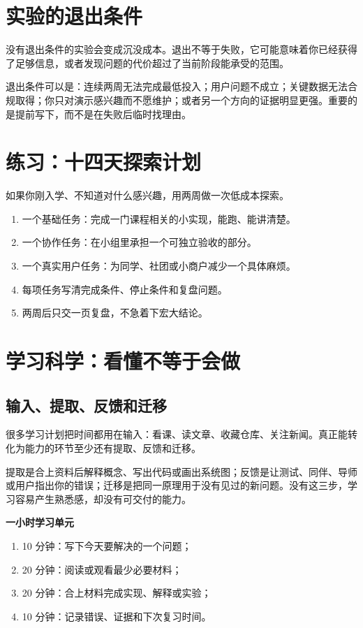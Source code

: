 \documentclass[UTF8,zihao=5,openany]{ctexbook}
\begin{document}
\section{实验的退出条件}
没有退出条件的实验会变成沉没成本。退出不等于失败，它可能意味着你已经获得了足够信息，或者发现问题的代价超过了当前阶段能承受的范围。

退出条件可以是：连续两周无法完成最低投入；用户问题不成立；关键数据无法合规取得；你只对演示感兴趣而不愿维护；或者另一个方向的证据明显更强。重要的是提前写下，而不是在失败后临时找理由。

\section{练习：十四天探索计划}
如果你刚入学、不知道对什么感兴趣，用两周做一次低成本探索。

\begin{enumerate}
\item 一个基础任务：完成一门课程相关的小实现，能跑、能讲清楚。
\item 一个协作任务：在小组里承担一个可独立验收的部分。
\item 一个真实用户任务：为同学、社团或小商户减少一个具体麻烦。
\item 每项任务写清完成条件、停止条件和复盘问题。
\item 两周后只交一页复盘，不急着下宏大结论。
\end{enumerate}

\section{学习科学：看懂不等于会做}
\subsection{输入、提取、反馈和迁移}
很多学习计划把时间都用在输入：看课、读文章、收藏仓库、关注新闻。真正能转化为能力的环节至少还有提取、反馈和迁移。

提取是合上资料后解释概念、写出代码或画出系统图；反馈是让测试、同伴、导师或用户指出你的错误；迁移是把同一原理用于没有见过的新问题。没有这三步，学习容易产生熟悉感，却没有可交付的能力。

\begin{toolbox}
\textbf{一小时学习单元}
\begin{enumerate}
\item 10 分钟：写下今天要解决的一个问题；
\item 20 分钟：阅读或观看最少必要材料；
\item 20 分钟：合上材料完成实现、解释或实验；
\item 10 分钟：记录错误、证据和下次复习时间。
\end{enumerate}
\end{toolbox}
\end{document}
